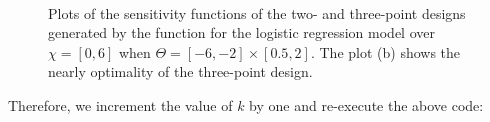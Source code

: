 \begin{figure}[t!]
\centering
{}
\\
\caption{
  Plots of the  sensitivity functions of  the two- and three-point designs generated by the   function for the logistic regression model over $ \chi = [0, 6]$ when $\Theta = [-6, -2]\times[0.5, 2]$.  The plot (b) shows the nearly optimality of the three-point design.
}
\label{fig:sensitivity-logistic-minimax}
\end{figure}
Therefore, we increment the value of $k$ by one and re-execute the above code:
